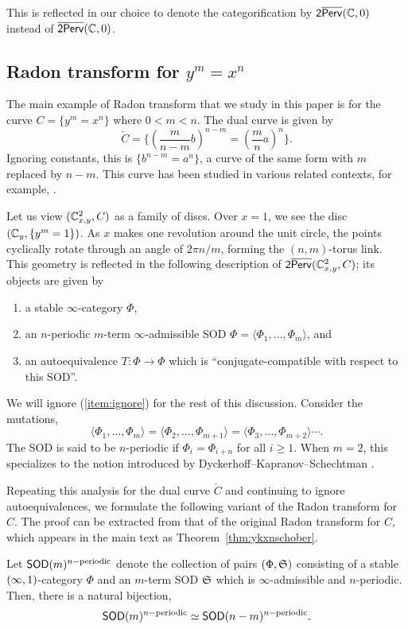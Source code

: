 This is reflected in our choice to denote the categorification by $\mathsf{2}\overline{\mathsf{Perv}}(\mathbb{C},0)$ instead of $\overline{\mathsf{2Perv}}(\mathbb{C},0)$.

\subsection{Radon transform for \texorpdfstring{$y^m=x^n$}{y\^{}m=x\^{}n}}
The main example of Radon transform that we study in this paper is for the curve $C=\{y^m = x^n\}$ where $0<m<n$. The dual curve is given by
\[\check{C} = \{\left(\frac{m}{n-m}b\right)^{n-m} = \left(\frac{m}{n}a\right)^n\}.\]
Ignoring constants, this is $\{b^{n-m} = a^n\}$, a curve of the same form with $m$ replaced by $n-m$. This curve has been studied in various related contexts, for example, \cites{oblomkovHilbertSchemePlane2012,macphersonPerverseSheavesSingularities1988}.

Let us view $(\mathbb{C}^2_{x,y},C)$ as a family of discs. Over $x=1$, we see the disc $(\mathbb{C}_y,\{y^m=1\})$. As $x$ makes one revolution around the unit circle, the points cyclically rotate through an angle of $2\pi n/m$, forming the $(n,m)$-torus link. This geometry is reflected in the following description of $\mathsf{2}\overline{\mathsf{Perv}}(\mathbb{C}^2_{x,y},C)$; its objects are given by
\begin{enumerate}
    \item a stable $\infty$-category $\Phi$,
    \item an $n$-periodic $m$-term $\infty$-admissible SOD $\Phi = \langle\Phi_1,\dots,\Phi_m\rangle$, and
    \item\label{item:ignore} an autoequivalence $T:\Phi\to \Phi$ which is ``conjugate-compatible with respect to this SOD''.
\end{enumerate}
We will ignore (\ref{item:ignore}) for the rest of this discussion. Consider the mutations,
\[\langle\Phi_1,\dots,\Phi_m\rangle = \langle\Phi_2,\dots,\Phi_{m+1}\rangle = \langle\Phi_3,\dots,\Phi_{m+2}\rangle\cdots.\]
The SOD is said to be $n$-periodic if $\Phi_{i} = \Phi_{i+n}$ for all $i\geq1$. When $m=2$, this specializes to the notion introduced by Dyckerhoff--Kapranov--Schechtman \cite{dyckerhoffNsphericalFunctorsCategorification2023}.

Repeating this analysis for the dual curve $\check{C}$ and continuing to ignore autoequivalences, we formulate the following variant of the Radon transform for $C$. The proof can be extracted from that of the original Radon transform for $C$, which appears in the main text as Theorem~\ref{thm:ykxnschober}.
\begin{thm}\label{thm:radonsod}
    Let $\mathsf{SOD}(m)^{n\mathrm{-periodic}}$ denote the collection of pairs $(\Phi,\mathfrak{S})$ consisting of a stable $(\infty,1)$-category $\Phi$ and an $m$-term SOD $\mathfrak{S}$ which is $\infty$-admissible and $n$-periodic. Then, there is a natural bijection,
    \[\mathsf{SOD}(m)^{n\mathrm{-periodic}}\simeq \mathsf{SOD}(n-m)^{n\mathrm{-periodic}}.\]
\end{thm}

